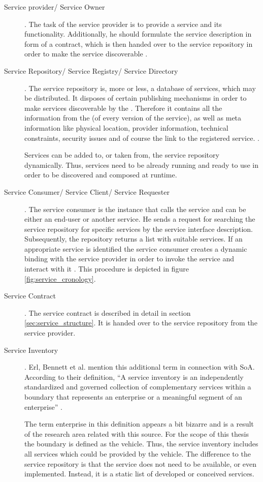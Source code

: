 \begin{description}
\item [Service provider/ Service Owner]. 
The task of the service provider is to provide a service and its functionality. Additionally, he should formulate the service description in form of a contract, which is then handed over to the service repository in order to make the service discoverable \cite{breivold}.

\item [Service Repository/ Service Registry/ Service Directory].
The service repository is, more or less, a database of services, which may be distributed. It disposes of certain publishing mechanisms in order to make services discoverable by the . Therefore it contains all the information from the (of every version of the service), as well as meta information like physical location, provider information, technical constraints, security issues and of course the link to the registered service. \cite[p.60-61]{krafzig} \cite{breivold} \cite{converge}.

Services can be added to, or taken from, the service repository dynamically. Thus, services need to be already running and ready to use in order to be discovered and composed at runtime.

\item [Service Consumer/ Service Client/ Service Requester] .
The service consumer is the instance that calls the service and can be either an end-user or another service. He sends a request for searching the service repository for specific services by the service interface description. Subsequently, the repository returns a list with suitable services. If an appropriate service is identified the service consumer creates a dynamic binding with the service provider in order to invoke the service and interact with it \cite{breivold} \cite{converge}. This procedure is depicted in figure \ref{fig:service_cronology}.

\item [Service Contract] .
The service contract is described in detail in section \ref{sec:service_structure}. It is handed over to the service repository from the service provider.

\item [Service Inventory] .
Erl, Bennett et al. mention this additional term in connection with SoA. According to their definition, ``A service inventory is an independently standardized and governed collection of complementary services within a boundary that represents an enterprise or a meaningful segment of an enterprise'' \cite[p.41]{erl2011}. 

The term enterprise in this definition appears a bit bizarre and is a result of the research area related with this source. For the scope of this thesis the boundary is defined as the vehicle. Thus, the service inventory includes all services which could be provided by the vehicle. The difference to the service repository is that the service does not need to be available, or even implemented. Instead, it is a static list of developed or conceived services.
\end{description}

